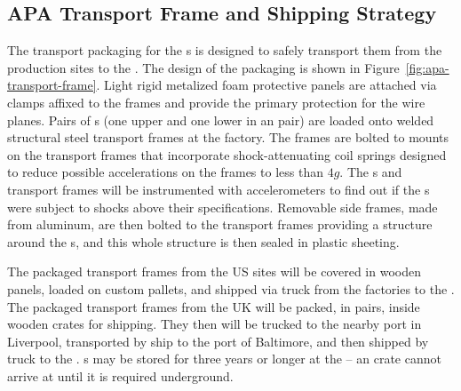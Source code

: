 \subsection{APA Transport Frame and Shipping Strategy}
\label{sec:fdsp-apa-transport-container}


The transport packaging for the s is designed to safely transport them from the production sites to the . %
The design of the packaging is shown in Figure~\ref{fig:apa-transport-frame}. Light rigid metalized foam protective panels are attached via clamps affixed to the  frames and provide the primary protection for the wire planes. Pairs of s (one upper and one lower in an  pair) are loaded onto welded structural steel transport frames at the factory. The  frames are bolted to mounts on the transport frames that incorporate shock-attenuating coil springs designed to reduce possible accelerations on the  frames to less than $4g$. The s and transport frames will be instrumented with accelerometers to %
find out if the s were subject to shocks above their specifications. Removable side frames, made from aluminum, are then bolted to the transport frames providing a structure around the s, and this whole structure is then %
sealed in plastic sheeting. 

The packaged transport frames from the US sites will be covered in wooden panels, loaded on custom pallets, and shipped via truck from the  factories to the . %
The packaged transport frames from the UK will be packed, in pairs, inside wooden crates for shipping. They then will be trucked to the nearby port in Liverpool, transported by ship to the port of Baltimore, and then shipped by truck to the . %
s may be stored for three years or longer at the  -- an  crate cannot arrive at  until it is required underground. 

